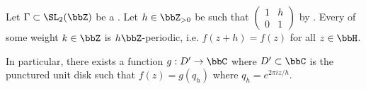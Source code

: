 \begin{lemma} \label{lemma:weakly_modular_form_for_any_congruence_subgroup_of_SL_2_Z_is_periodic}
    Let $\Gamma \subset \SL_2(\bbZ)$ be a .
    Let $h \in \bbZ_{> 0}$ be such that $\begin{pmatrix} 1 & h \\ 0 & 1 \end{pmatrix}$ by . 
    Every  of some weight $k \in \bbZ$ is $h\bbZ$-periodic, i.e. $f(z+h) = f(z)$ for all $z \in \bbH$.

    In particular, there exists a function $g: D ' \to \bbC$ where $D' \subset \bbC$ is the punctured unit disk such that $f(z) = g(q_h)$ where $q_h = e^{2 \pi i z/h}$.
\end{lemma}